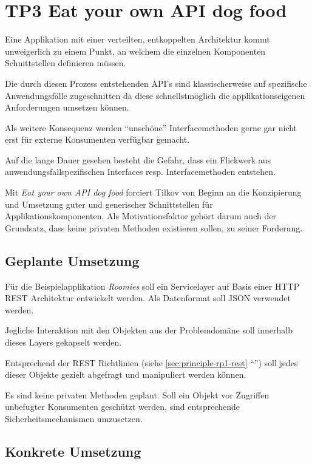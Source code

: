 \section{TP3 Eat your own API dog food}
\label{sec:principle-tp3-eat-your-own-api}

Eine Applikation mit einer verteilten, entkoppelten Architektur kommt unweigerlich zu einem Punkt, an welchem die einzelnen Komponenten Schnittstellen definieren müssen.

Die durch diesen Prozess entstehenden API's sind klassischerweise auf spezifische Anwendungsfälle zugeschnitten da diese schnellstmöglich die applikationseigenen Anforderungen umsetzen können.

Als weitere Konsequenz werden ``unschöne'' Interfacemethoden gerne gar nicht erst für externe Konsumenten verfügbar gemacht.

Auf die lange Dauer gesehen besteht die Gefahr, dass ein Flickwerk aus anwendungsfallspezifischen Interfaces resp. Interfacemethoden entstehen.

Mit \emph{Eat your own API dog food} forciert Tilkov von Beginn an die Konzipierung und Umsetzung guter und generischer Schnittstellen für Applikationskomponenten. Als Motivationsfaktor gehört darum auch der Grundsatz, dass keine privaten Methoden existieren sollen, zu seiner Forderung.


\subsection*{Geplante Umsetzung}

Für die Beispielapplikation \emph{Roomies} soll ein Servicelayer auf Basis einer HTTP \gls{REST} Architektur entwickelt werden. Als Datenformat soll \gls{JSON} verwendet werden.

Jegliche Interaktion mit den Objekten aus der Problemdomäne soll innerhalb dieses Layers gekapselt werden.

Entsprechend der \gls{REST} Richtlinien (siehe \ref{sec:principle-rp1-rest} ``'') soll jedes dieser Objekte gezielt abgefragt und manipuliert werden können.

Es sind keine privaten Methoden geplant. Soll ein Objekt vor Zugriffen unbefugter Konsumenten geschützt werden, sind entsprechende Sicherheitsmechanismen umzusetzen.


\subsection*{Konkrete Umsetzung}

